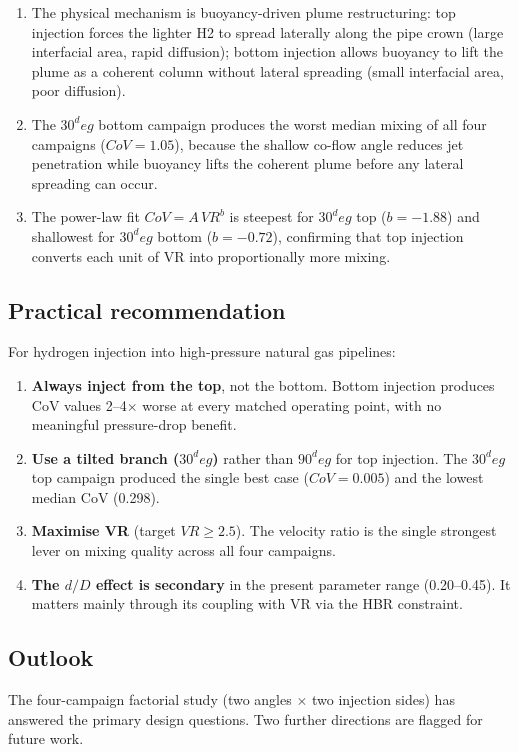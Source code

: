\documentclass[11pt,a4paper]{article}
\def\Hi{H2}%
\def\dD{d/D}%
\def\VR{VR}%
\def\HBR{HBR}%
\def\CoV{CoV}%
\def\circ{ deg}%
\newcommand{\Hi}{\ensuremath{\mathrm{H_2}}}
\newcommand{\dD}{\ensuremath{d/D}}
\newcommand{\VR}{\ensuremath{\mathrm{VR}}}
\newcommand{\HBR}{\ensuremath{\mathrm{HBR}}}
\newcommand{\CoV}{\ensuremath{\mathrm{CoV}}}
\begin{document}
\begin{enumerate}
    median), so the injection side affects only mixing, not pumping
    cost. Top injection is therefore strictly dominant.
    \item The physical mechanism is buoyancy-driven plume
    restructuring: top injection forces the lighter \Hi{} to spread
    laterally along the pipe crown (large interfacial area, rapid
    diffusion); bottom injection allows buoyancy to lift the plume
    as a coherent column without lateral spreading (small
    interfacial area, poor diffusion).
    \item The \(30^\circ\) bottom campaign produces the worst median
    mixing of all four campaigns (\(\CoV = 1.05\)), because the
    shallow co-flow angle reduces jet penetration while buoyancy
    lifts the coherent plume before any lateral spreading can occur.
    \item The power-law fit \(\CoV = A\,\VR^{b}\) is steepest for
    \(30^\circ\) top (\(b=-1.88\)) and shallowest for
    \(30^\circ\) bottom (\(b=-0.72\)), confirming that top injection
    converts each unit of \VR{} into proportionally more mixing.
\end{enumerate}

\subsection{Practical recommendation}
For hydrogen injection into high-pressure natural gas pipelines:
\begin{enumerate}
    \item \textbf{Always inject from the top}, not the bottom.
    Bottom injection produces \CoV{} values 2--4$\times$ worse at
    every matched operating point, with no meaningful
    pressure-drop benefit.
    \item \textbf{Use a tilted branch (\(30^\circ\))} rather than
    \(90^\circ\) for top injection. The \(30^\circ\) top campaign
    produced the single best case (\(\CoV = 0.005\)) and the lowest
    median \CoV{} (0.298).
    \item \textbf{Maximise \VR} (target \(\VR \ge 2.5\)). The
    velocity ratio is the single strongest lever on mixing quality
    across all four campaigns.
    \item \textbf{The \(\dD\) effect is secondary} in the present
    parameter range (0.20--0.45). It matters mainly through its
    coupling with \VR{} via the \HBR{} constraint.
\end{enumerate}

\subsection{Outlook}
The four-campaign factorial study (two angles \(\times\) two
injection sides) has answered the primary design questions. Two
further directions are flagged for future work.
\end{document}
